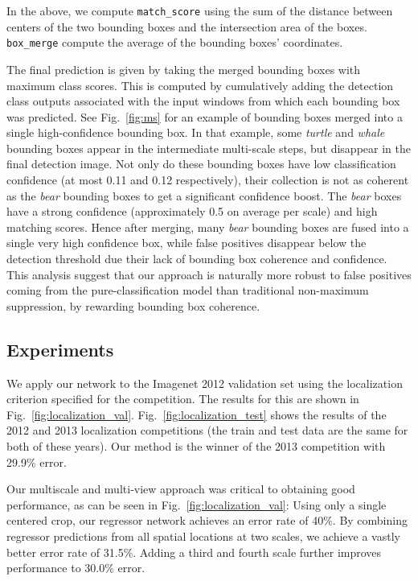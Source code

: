 \documentclass{article} %
\newcommand{\fig}[1]{Fig.~\ref{fig:#1}}
\begin{document}
In the above, we compute {\tt match\_score} using the sum of the distance
between centers of the two bounding boxes and the intersection area of the boxes.
{\tt box\_merge} compute the average of the bounding boxes' coordinates.

The final prediction is given by taking the merged bounding boxes with maximum
class scores.  This is computed by cumulatively adding the detection class
outputs associated with the input windows from which each bounding box was
predicted. See \fig{ms} for an example of bounding boxes merged into a single
high-confidence bounding box. In that example, some {\em turtle} and {\em whale}
bounding boxes appear in the intermediate multi-scale steps, but disappear
in the final detection image. Not only do these bounding boxes have low classification
confidence (at most 0.11 and 0.12 respectively), their collection is not as coherent
as the {\em bear} bounding boxes to get a significant confidence boost.
The {\em bear} boxes have a strong confidence (approximately 0.5 on average 
per scale) and high matching scores. Hence after merging, many {\em bear} bounding boxes
are fused into a single very high confidence box, while false positives disappear
below the detection threshold due their lack of bounding box coherence and confidence.
This analysis suggest that our approach is naturally more robust to false positives
coming from the pure-classification model than traditional non-maximum suppression,
by rewarding bounding box coherence.

\subsection{Experiments}

We apply our network to the Imagenet 2012 validation set using the
localization criterion specified for the competition. The results for this are shown in
\fig{localization_val}. \fig{localization_test} shows the results of the 2012 and 2013
localization competitions (the train and test data are the same for both of these years).
Our method is the winner of the 2013 competition with 29.9\% error.

Our multiscale and multi-view approach was critical to obtaining good
performance, as can be seen in \fig{localization_val}:  Using only a single centered
crop, our regressor network achieves an error rate of 40\%.  By combining
regressor predictions from all spatial locations at two scales, we achieve a
vastly better error rate of 31.5\%. Adding a third and fourth scale further improves
performance to 30.0\% error.
\end{document}
